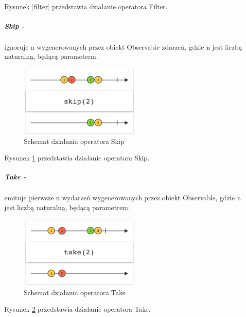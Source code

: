 \documentclass[12pt,oneside,a4paper]{report}
\begin{document}
\\\\\\\\\\\\\\\\\\
Rysunek \ref{filter} przedstawia działanie operatora Filter.
\subparagraph{Skip -}ignoruje n wygenerowanych przez obiekt Observable zdarzeń, gdzie n jest liczbą naturalną, będącą parametrem.
\begin{figure}[ht!]
	\centering
	\includegraphics[width=6cm]{skip}
	\caption{Schemat działania operatora Skip\cite{marbles}}
	\label{skip}
\end{figure}
Rysunek \ref{skip} przedstawia działanie operatora Skip.
\subparagraph{Take -}emituje pierwsze n wydarzeń wygenerowanych przez obiekt Observable, gdzie n jest liczbą naturalną, będącą parametrem.
\begin{figure}[ht!]
	\centering
	\includegraphics[width=6cm]{take}
	\caption{Schemat działania operatora Take\cite{marbles}}
	\label{take}
\end{figure}
Rysunek \ref{take} przedstawia działanie operatora Take.
\pagebreak
\end{document}
